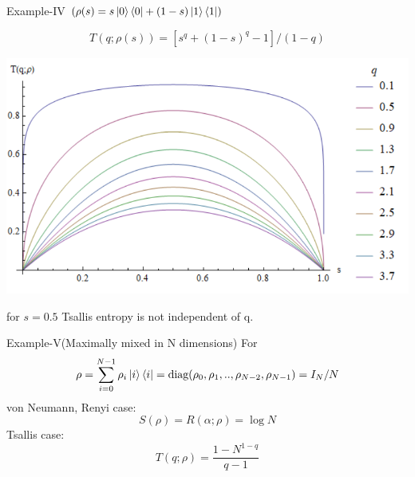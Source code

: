 \documentclass{beamer}
\begin{document}
\begin{frame}{Example-IV $\left(\rho(s) = s \ket{0} \bra{0} + (1-s) \ket{1} \bra{1}\right)$}
\begin{scriptsize}
\begin{equation*}
T(q;\rho(s))=
\left[ s^{q }+(1-s)^{q }-1 \right]/(1-q)
\end{equation*}
\begin{center}
\includegraphics[scale=0.45]{figures/tsallis_ent_plot.png}
\end{center}
for $s=0.5$ Tsallis entropy is not independent of q.
\end{scriptsize}
\end{frame}

\begin{frame}{Example-V(Maximally mixed in N dimensions)}
For
$$ \rho = \sum_{i=0}^{N-1}\rho_{i}\ket{i}\bra{i} = \operatorname{\textup{diag}} (\rho_{0},\rho_{1},..,\rho_{N-2},\rho_{N-1})=I_{N}/N$$
von Neumann, Renyi case:
\begin{equation}
S(\rho)=R(\alpha;\rho)=\log N
\end{equation}
Tsallis case:
\begin{equation}
T(q;\rho)=\frac{1-N^{1-q}}{q-1}
\end{equation}
\end{frame}
\end{document}
